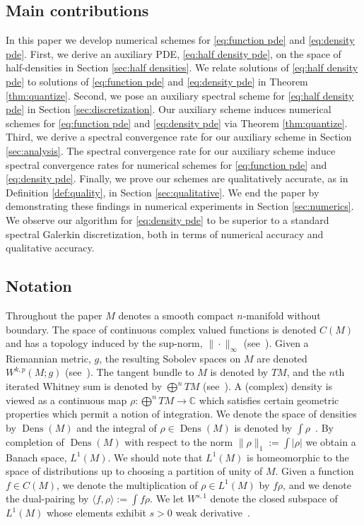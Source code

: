 \documentclass[final,leqno]{siamart}
\DeclareMathOperator{\Dens}{Dens}
\begin{document}
\subsection{Main contributions}

In this paper we develop numerical schemes for \eqref{eq:function pde} and \eqref{eq:density pde}.
First, we derive an auxiliary PDE, \eqref{eq:half density pde}, on the space of half-densities in Section \ref{sec:half densities}.
We relate solutions of \eqref{eq:half density pde} to solutions of \eqref{eq:function pde} and \eqref{eq:density pde} in Theorem \ref{thm:quantize}.
Second, we pose an auxiliary spectral scheme for \eqref{eq:half density pde} in Section \ref{sec:discretization}.
Our auxiliary scheme induces numerical schemes for \eqref{eq:function pde} and \eqref{eq:density pde} via Theorem \ref{thm:quantize}.
Third, we derive a spectral convergence rate for our auxiliary scheme in Section \ref{sec:analysis}.
The spectral convergence rate for our auxiliary scheme induce spectral convergence rates for numerical schemes for \eqref{eq:function pde} and \eqref{eq:density pde}.
Finally, we prove our schemes are qualitatively accurate, as in Definition \ref{def:quality}, in Section \ref{sec:qualitative}.
We end the paper by demonstrating these findings in numerical experiments in Section \ref{sec:numerics}.
We observe our algorithm for \eqref{eq:density pde} to be superior to a standard spectral Galerkin discretization, both in terms of numerical accuracy and qualitative accuracy.

\subsection{Notation}
Throughout the paper $M$ denotes a smooth compact $n$-manifold without boundary. 
The space of continuous complex valued functions is denoted $C(M)$ and has a topology induced by the sup-norm, $\| \cdot \|_{\infty}$ (see~\cite{Taylor1974,Rudin1991,MTA,Conway1990}).
Given a Riemannian metric, $g$, the resulting Sobolev spaces on $M$ are denoted $W^{k,p}(M ; g)$ (see~\cite{Hebey1999}).
The tangent bundle to $M$ is denoted by $TM$, and the $n$th iterated Whitney sum is denoted by $\bigoplus^{n} TM$ (see~\cite{Lee2006,MTA}).
A (complex) density is viewed as a continuous map $\rho: \bigoplus^{n}TM \to \mathbb{C}$ which satisfies certain geometric properties which permit a notion of integration.
We denote the space of densities by $\Dens(M)$ and the integral of $\rho \in \Dens(M)$ is denoted by $\int \rho$~\cite[Chapter 16]{Lee2006}.
By completion of $\Dens(M)$ with respect to the norm $\| \rho \|_{1} := \int | \rho|$ we obtain a Banach space, $L^{1}(M)$.
We should note that $L^1(M)$ is homeomorphic to the space of distributions up to choosing a partition of unity of $M$.
Given a function $f \in C(M)$, we denote the multiplication of $\rho \in L^{1}(M)$ by $f \rho$, and we denote the dual-pairing by $\langle f , \rho \rangle := \int f \rho$.
We let $W^{s,1}$ denote the closed subspace of $L^{1}(M)$ whose elements exhibit $s>0$ weak derivative~\cite{Hormander2003}.
\end{document}
